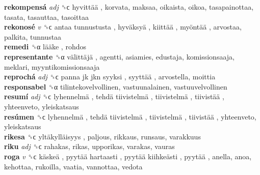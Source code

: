\textbf{rekompensá} \emph{adj}  ␝ϲ   hyvittää , korvata, maksaa, oikaista, oikoa, tasapainottaa, tasata, tasauttaa, tasoittaa  \\
\textbf{rekonosé} \emph{v}  ␝ϲ   antaa tunnustusta ,  hyväksyä ,  kiittää ,  myöntää , arvostaa, palkita, tunnustaa  \\
\textbf{remedi} ␝α   lääke , rohdos  \\
\textbf{representante} ␝α   välittäjä , agentti, asiamies, edustaja, komissionsaaja, meklari, myyntikomissionsaaja  \\
\textbf{reprochá} \emph{adj}  ␝ϲ   panna jk jkn syyksi ,  syyttää , arvostella, moittia  \\
\textbf{responsabel} ␝α  tilintekovelvollinen, vastuunalainen, vastuuvelvollinen  \\
\textbf{resumí} \emph{adj}  ␝ϲ   lyhennelmä ,  tehdä tiivistelmä ,  tiivistelmä ,  tiivistää , yhteenveto, yleiskatsaus  \\
\textbf{resúmen} ␝ϲ   lyhennelmä ,  tehdä tiivistelmä ,  tiivistelmä ,  tiivistää , yhteenveto, yleiskatsaus  \\
\textbf{rikesa} ␝ϲ   yltäkylläisyys , paljous, rikkaus, runsaus, varakkuus  \\
\textbf{riku} \emph{adj}  ␝ϲ  rahakas, rikas, upporikas, varakas, vauras  \\
\textbf{roga} \emph{v}  ␝ϲ   käskeä ,  pyytää hartaasti ,  pyytää kiihkeästi ,  pyytää , anella, anoa, kehottaa, rukoilla, vaatia, vannottaa, vedota  \\
